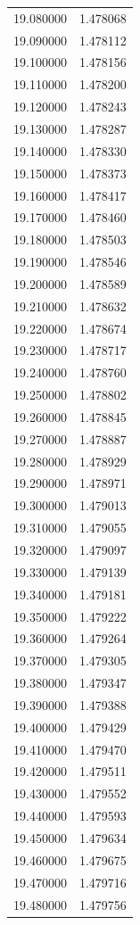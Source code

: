 \begin{tabular}{rr}
19.080000 & 1.478068 \\
19.090000 & 1.478112 \\
19.100000 & 1.478156 \\
19.110000 & 1.478200 \\
19.120000 & 1.478243 \\
19.130000 & 1.478287 \\
19.140000 & 1.478330 \\
19.150000 & 1.478373 \\
19.160000 & 1.478417 \\
19.170000 & 1.478460 \\
19.180000 & 1.478503 \\
19.190000 & 1.478546 \\
19.200000 & 1.478589 \\
19.210000 & 1.478632 \\
19.220000 & 1.478674 \\
19.230000 & 1.478717 \\
19.240000 & 1.478760 \\
19.250000 & 1.478802 \\
19.260000 & 1.478845 \\
19.270000 & 1.478887 \\
19.280000 & 1.478929 \\
19.290000 & 1.478971 \\
19.300000 & 1.479013 \\
19.310000 & 1.479055 \\
19.320000 & 1.479097 \\
19.330000 & 1.479139 \\
19.340000 & 1.479181 \\
19.350000 & 1.479222 \\
19.360000 & 1.479264 \\
19.370000 & 1.479305 \\
19.380000 & 1.479347 \\
19.390000 & 1.479388 \\
19.400000 & 1.479429 \\
19.410000 & 1.479470 \\
19.420000 & 1.479511 \\
19.430000 & 1.479552 \\
19.440000 & 1.479593 \\
19.450000 & 1.479634 \\
19.460000 & 1.479675 \\
19.470000 & 1.479716 \\
19.480000 & 1.479756 \\

\end{tabular}
